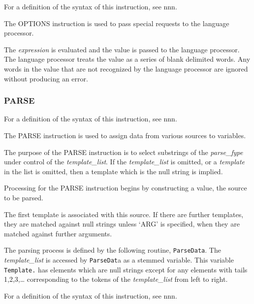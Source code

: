 For a definition of the syntax of this instruction, see nnn.

The OPTIONS instruction is used to pass special requests to the language
processor.

The \emph{expression} is evaluated and the value is passed to the
language processor. The language processor treats the value as a series
of blank delimited words. Any words in the value that are not recognized
by the language processor are ignored without producing an error.



\subsubsection{PARSE}\label{parse}

For a definition of the syntax of this instruction, see nnn.

The PARSE instruction is used to assign data from various sources to
variables.

The purpose of the PARSE instruction is to select substrings of the
\emph{parse\_fype} under control of the \emph{template\_list}. If the
\emph{template\_list} is omitted, or a \emph{template} in the list is
omitted, then a template which is the null string is implied.

Processing for the PARSE instruction begins by constructing a value, the
source to be parsed.



The first template is associated with this source. If there are further
templates, they are matched against null strings unless `ARG' is
specified, when they are matched against further arguments.

The parsing process is defined by the following routine,
\texttt{ParseData}. The \emph{template\_list} is accessed by
\texttt{ParseDat}a as a stemmed variable. This variable
\texttt{Template.} has elements which are null strings except for any
elements with tails 1,2,3,\ldots{} corresponding to the tokens of the
\emph{template\_list} from left to right.



For a definition of the syntax of this instruction, see nnn.

